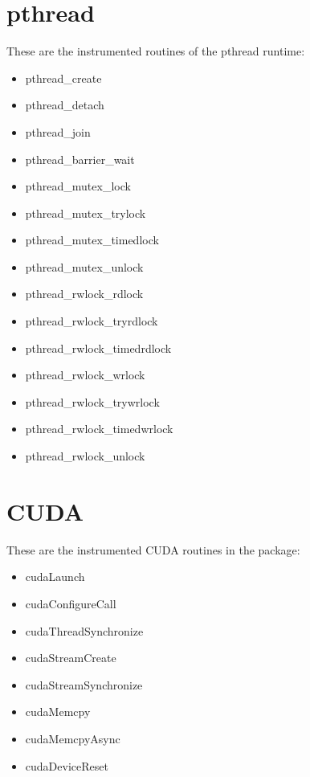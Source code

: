 \section{pthread}\label{sec:OpenMPruntimesinstrumented}

These are the instrumented routines of the pthread runtime:

\begin{itemize}
\item pthread\_create
\item pthread\_detach
\item pthread\_join
\item pthread\_barrier\_wait
\item pthread\_mutex\_lock
\item pthread\_mutex\_trylock
\item pthread\_mutex\_timedlock
\item pthread\_mutex\_unlock
\item pthread\_rwlock\_rdlock
\item pthread\_rwlock\_tryrdlock
\item pthread\_rwlock\_timedrdlock
\item pthread\_rwlock\_wrlock
\item pthread\_rwlock\_trywrlock
\item pthread\_rwlock\_timedwrlock
\item pthread\_rwlock\_unlock
\end{itemize}

\section{CUDA}\label{sec:CUDAinstrumentedroutines}

These are the instrumented CUDA routines in the \TRACE package:

\begin{itemize}
\item cudaLaunch
\item cudaConfigureCall
\item cudaThreadSynchronize
\item cudaStreamCreate
\item cudaStreamSynchronize
\item cudaMemcpy
\item cudaMemcpyAsync
\item cudaDeviceReset
\end{itemize}

